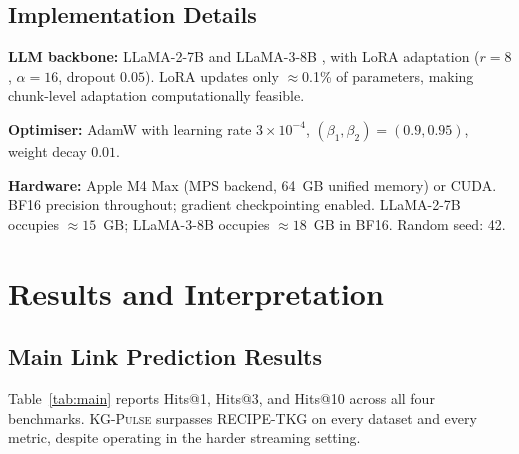 \documentclass[10pt,a4paper,twocolumn]{article}
\theoremstyle{definition}
\newcommand{\ourmodel}{\textsc{KG-Pulse}}
\newcommand{\basemodel}{RECIPE-TKG}
\begin{document}
\subsection{Implementation Details}

\textbf{LLM backbone:} LLaMA-2-7B \cite{Touvron2023llama2} and
LLaMA-3-8B \cite{Meta2024llama3}, with LoRA \cite{Hu2021lora}
adaptation ($r{=}8$, $\alpha{=}16$, dropout $0.05$).
LoRA updates only $\approx$0.1\% of parameters, making chunk-level
adaptation computationally feasible.

\textbf{Optimiser:} AdamW with learning rate $3{\times}10^{-4}$,
$(\beta_1, \beta_2) = (0.9, 0.95)$, weight decay $0.01$.

\textbf{Hardware:} Apple M4 Max (MPS backend, 64~GB unified memory)
or CUDA.
BF16 precision throughout; gradient checkpointing enabled.
LLaMA-2-7B occupies ${\approx}15$~GB; LLaMA-3-8B occupies
${\approx}18$~GB in BF16.
Random seed: 42.

\section{Results and Interpretation}
\label{sec:results}

\subsection{Main Link Prediction Results}
\label{sec:main_results}

Table~\ref{tab:main} reports Hits@1, Hits@3, and Hits@10 across all four
benchmarks.
\ourmodel{} surpasses \basemodel{} on every dataset and every metric,
despite operating in the harder streaming setting.
\end{document}
